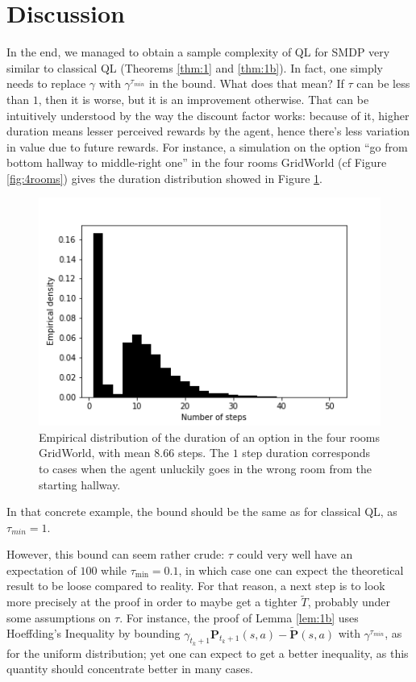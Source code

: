 \section{Discussion}
\label{sec:discussion}

In the end, we managed to obtain a sample complexity of QL for SMDP very similar to classical QL (Theorems \ref{thm:1} and \ref{thm:1b}). In fact, one simply needs to replace $\gamma$ with $\gamma^{\tau_{min}}$  in the bound. What does that mean? If $\tau$ can be less than $1$, then it is worse, but it is an improvement otherwise. That can be intuitively understood by the way the discount factor works: because of it, higher duration means lesser perceived rewards by the agent, hence there's less variation in value due to future rewards. For instance, a simulation on the option ``go from bottom hallway to middle-right one'' in the four rooms GridWorld (cf Figure \ref{fig:4rooms}) gives the duration distribution showed in Figure \ref{fig:duration}.

\begin{figure}[htb]
\centering
\includegraphics[width=0.7\linewidth, keepaspectratio]{duration_option_4rooms.png}
\decoRule
\caption{Empirical distribution of the duration of an option in the four rooms GridWorld, with mean $8.66$ steps. The $1$ step duration corresponds to cases when the agent unluckily goes in the wrong room from the starting hallway.}
\label{fig:duration}
\end{figure}

In that concrete example, the bound should be the same as for classical QL, as $\tau_{min} = 1$.

However, this bound can seem rather crude: $\tau$ could very well have an expectation of $100$ while $\tau_{\min} = 0.1$, in which case one can expect the theoretical result to be loose compared to reality. For that reason, a next step is to look more precisely at the proof in order to maybe get a tighter $\tilde T$, probably under some assumptions on $\tau$. For instance, the proof of Lemma \ref{lem:1b} uses Hoeffding's Inequality by bounding $\gamma_{t_k+1} \mathbf{P}_{t_k+1}(s,a) - \tilde{\mathbf{P}}(s,a)$ with $\gamma^{\tau_{min}}$, as for the uniform distribution; yet one can expect to get a better inequality, as this quantity should concentrate better in many cases.

